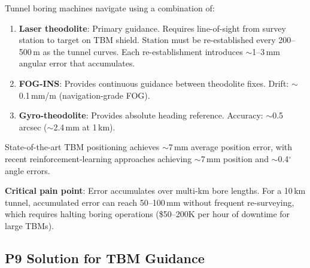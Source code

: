\documentclass[11pt]{article}
\theoremstyle{definition}
\theoremstyle{remark}
\begin{document}
Tunnel boring machines navigate using a combination of:
\begin{enumerate}[nosep]
\item \textbf{Laser theodolite}: Primary guidance. Requires line-of-sight
  from survey station to target on TBM shield. Station must be re-established
  every 200--500\,m as the tunnel curves. Each re-establishment introduces
  $\sim$1--3\,mm angular error that accumulates.
\item \textbf{FOG-INS}: Provides continuous guidance between theodolite
  fixes. Drift: $\sim$0.1\,mm/m (navigation-grade FOG).
\item \textbf{Gyro-theodolite}: Provides absolute heading reference.
  Accuracy: $\sim$0.5\,arcsec ($\sim$2.4\,mm at 1\,km).
\end{enumerate}

State-of-the-art TBM positioning achieves $\sim$7\,mm average position
error, with recent reinforcement-learning approaches achieving
$\sim$7\,mm position and $\sim$0.4$^\circ$ angle errors.

\textbf{Critical pain point}: Error accumulates over multi-km bore
lengths. For a 10\,km tunnel, accumulated error can reach 50--100\,mm
without frequent re-surveying, which requires halting boring operations
(\$50--200K per hour of downtime for large TBMs).

\subsection{P9 Solution for TBM Guidance}
\end{document}

